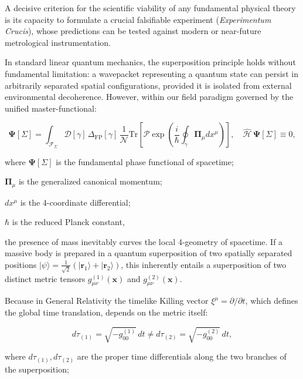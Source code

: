 A decisive criterion for the scientific viability of any fundamental physical theory is its capacity to formulate a crucial falsifiable experiment (\textit{Experimentum Crucis}), whose predictions can be tested against modern or near-future metrological instrumentation.

In standard linear quantum mechanics, the superposition principle holds without fundamental limitation: a wavepacket representing a quantum state can persist in arbitrarily separated spatial configurations, provided it is isolated from external environmental decoherence. However, within our field paradigm governed by the unified master-functional:

\begin{equation}\label{eq:5.31}\tag{5.31}
\mathbf{\Psi}[\Sigma] = \int_{\mathcal{F}_\Sigma} \mathcal{D}[\gamma] \, \Delta_{\text{FP}}[\gamma] \, \frac{1}{\mathcal{N}} \text{Tr}\left[ \mathcal{P}\exp\left( \frac{i}{\hbar} \oint_\gamma \mathbf{\Pi}_\mu dx^\mu \right) \right], \quad \hat{\mathcal{H}}\,\mathbf{\Psi}[\Sigma] \equiv 0,
\end{equation}

where $\mathbf{\Psi}[\Sigma]$ is the fundamental phase functional of spacetime;  

$\mathbf{\Pi}_\mu$ is the generalized canonical momentum;  

$dx^\mu$ is the 4-coordinate differential;  

$\hbar$ is the reduced Planck constant,

the presence of mass inevitably curves the local 4-geometry of spacetime. If a massive body is prepared in a quantum superposition of two spatially separated positions $|\psi\rangle = \frac{1}{\sqrt{2}}(|\mathbf{r}_1\rangle + |\mathbf{r}_2\rangle)$, this inherently entails a superposition of two distinct metric tensors $g_{\mu\nu}^{(1)}(\mathbf{x})$ and $g_{\mu\nu}^{(2)}(\mathbf{x})$.

Because in General Relativity the timelike Killing vector $\xi^\mu = \partial / \partial t$, which defines the global time translation, depends on the metric itself:

\begin{equation}\label{eq:5.32}\tag{5.32}
d\tau_{(1)} = \sqrt{- g_{00}^{(1)}} \, dt \neq d\tau_{(2)} = \sqrt{- g_{00}^{(2)}} \, dt,
\end{equation}

where $d\tau_{(1)}, d\tau_{(2)}$ are the proper time differentials along the two branches of the superposition;  

